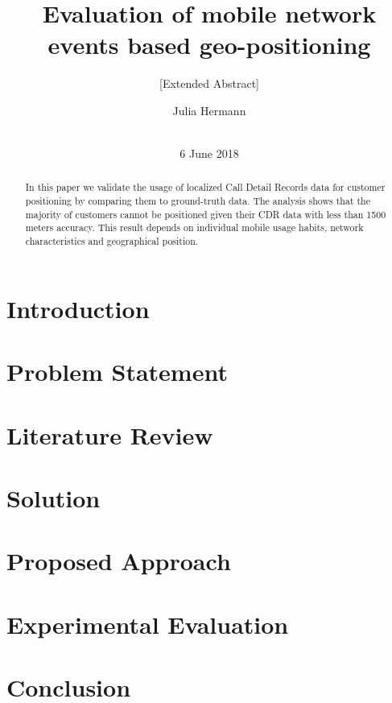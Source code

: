 \documentclass{sig-alternate-05-2015}
\begin{document}
\title{Evaluation of mobile network events based geo-positioning}
\subtitle{[Extended Abstract]}

\author{
\alignauthor
Julia Hermann\\
       \\
}

\maketitle
\date{6 June 2018}
\begin{abstract}
In this paper we validate the usage of localized Call Detail Records data for customer positioning by comparing them to ground-truth data. The analysis shows that the majority of customers cannot be positioned given their CDR data with less than 1500 meters accuracy. This result depends on individual mobile usage habits, network characteristics and geographical position.

\end{abstract}
\section{Introduction}
\section{Problem Statement}
\section{Literature Review}
\section{Solution}
\section{Proposed Approach}
\section{Experimental Evaluation}
\section{Conclusion}



\end{document}
